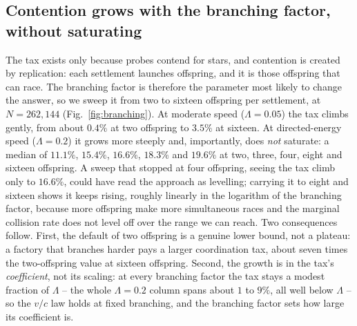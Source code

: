 \subsection{Contention grows with the branching factor, without saturating}
\label{sec:branching}
The tax exists only because probes contend for stars, and contention is created by replication:
each settlement launches offspring, and it is those offspring that can race. The branching factor
is therefore the parameter most likely to change the answer, so we sweep it from two to sixteen
offspring per settlement, at $N = 262{,}144$ (Fig.~\ref{fig:branching}). At moderate speed
($\Lambda = 0.05$) the tax climbs gently, from about $0.4\%$ at two offspring to $3.5\%$ at sixteen. At
directed-energy speed ($\Lambda = 0.2$) it grows more steeply and, importantly, does \emph{not}
saturate: a median of $11.1\%$, $15.4\%$, $16.6\%$, $18.3\%$ and $19.6\%$ at two, three, four, eight
and sixteen offspring. A sweep that
stopped at four offspring, seeing the tax climb only to $16.6\%$, could have read the approach as
levelling; carrying it to eight and sixteen shows it keeps rising, roughly linearly in the logarithm
of the branching factor, because more offspring make more simultaneous races and the marginal
collision rate does not level off over the range we can reach. Two consequences follow. First, the
default of two offspring is a genuine lower bound, not a plateau: a factory that branches harder pays
a larger coordination tax, about seven times the two-offspring value at sixteen offspring. Second,
the growth is in the tax's \emph{coefficient}, not its scaling: at every branching factor the tax
stays a modest fraction of $\Lambda$ -- the whole $\Lambda = 0.2$ column spans about $1$ to $9\%$, all
well below $\Lambda$ -- so the $v/c$ law holds at fixed branching, and the branching factor sets how large
its coefficient is.

